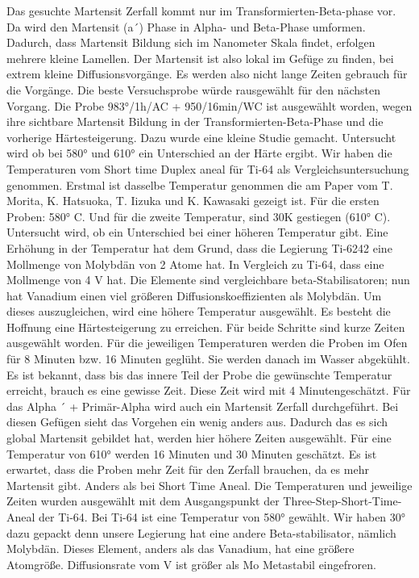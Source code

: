 Das gesuchte Martensit Zerfall kommt nur im Transformierten-Beta-phase vor. Da wird den Martensit (a´) Phase in Alpha- und Beta-Phase umformen. Dadurch, dass Martensit Bildung sich im Nanometer Skala findet, erfolgen mehrere kleine Lamellen. Der Martensit ist also lokal im Gefüge zu finden, bei extrem kleine Diffusionsvorgänge. Es werden also nicht lange Zeiten gebrauch für die Vorgänge.
Die beste Versuchsprobe würde rausgewählt für den nächsten Vorgang. Die Probe 983°/1h/AC + 950/16min/WC ist ausgewählt worden, wegen ihre sichtbare Martensit Bildung in der Transformierten-Beta-Phase und die vorherige Härtesteigerung. Dazu wurde eine kleine Studie gemacht. Untersucht wird ob bei 580° und 610° ein Unterschied an der Härte ergibt. Wir haben die Temperaturen vom Short time Duplex aneal für Ti-64 als Vergleichsuntersuchung genommen. Erstmal ist dasselbe Temperatur genommen die am Paper vom T. Morita, K. Hatsuoka, T. Iizuka und K. Kawasaki gezeigt ist. Für die ersten Proben: 580° C. Und für die zweite Temperatur, sind 30K gestiegen (610° C). Untersucht wird, ob ein Unterschied bei einer höheren Temperatur gibt. Eine Erhöhung in der Temperatur hat dem Grund, dass die Legierung Ti-6242 eine Mollmenge von Molybdän von 2 Atome hat. In Vergleich zu Ti-64, dass eine Mollmenge von 4 V hat. Die Elemente sind vergleichbare beta-Stabilisatoren; nun hat Vanadium einen viel größeren Diffusionskoeffizienten als Molybdän. Um dieses auszugleichen, wird eine höhere Temperatur ausgewählt. Es besteht die Hoffnung eine Härtesteigerung zu erreichen. Für beide Schritte sind kurze Zeiten ausgewählt worden. Für die jeweiligen Temperaturen werden die Proben im Ofen für 8 Minuten bzw. 16 Minuten geglüht. Sie werden danach im Wasser abgekühlt. 
Es ist bekannt, dass bis das innere Teil der Probe die gewünschte Temperatur erreicht, brauch es eine gewisse Zeit. Diese Zeit wird mit 4 Minutengeschätzt. 
Für das Alpha ´ + Primär-Alpha wird auch ein Martensit Zerfall durchgeführt. Bei diesen Gefügen sieht das Vorgehen ein wenig anders aus. Dadurch das es sich global Martensit gebildet hat, werden hier höhere Zeiten ausgewählt. Für eine Temperatur von 610° werden 16 Minuten und 30 Minuten geschätzt. Es ist erwartet, dass die Proben mehr Zeit für den Zerfall brauchen, da es mehr Martensit gibt. Anders als bei Short Time Aneal. 
Die Temperaturen und jeweilige Zeiten wurden ausgewählt mit dem Ausgangspunkt der Three-Step-Short-Time-Aneal der Ti-64. Bei Ti-64 ist eine Temperatur von 580° gewählt. Wir haben 30° dazu gepackt denn unsere Legierung hat eine andere Beta-stabilisator, nämlich Molybdän. Dieses Element, anders als das Vanadium, hat eine größere Atomgröße. Diffusionsrate vom V ist größer als Mo Metastabil eingefroren. %





